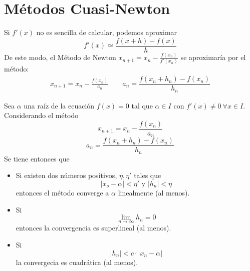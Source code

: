     \section{Métodos Cuasi-Newton}
    \begin{met}
    Si $f'(x)$ no es sencilla de calcular, podemos aproximar 
    $$f'(x)\simeq \dfrac{f(x+h)-f(x)}{h}$$
    De este modo, el Método de Newton $x_{n+1}=x_n-\frac{f(x_n)}{f'(x_n)}$
    se aproximaría por el método:
    \begin{align}
       x_{n+1}=x_n-\frac{f(x_n)}{a_n}\qquad a_n=\dfrac{f(x_n+h_n)-f(x_n)}{h_n}
       \label{met:cuasi}
    \end{align}
    \end{met}
    \begin{teo}
        Sea $\alpha$ una raíz de la ecuación $f(x)=0$ tal que $\alpha \in I$ con $f'(x)\neq 0 \: \forall x \in I$. Considerando el método
        $$x_{n+1}=x_n-\frac{f(x_n)}{a_n}$$
       $$a_n=\dfrac{f(x_n+h_n)-f(x_n)}{h_n}$$
       Se tiene entonces que
       \begin{itemize}
           \item Si existen dos números positivos, $\eta, \eta'$ tales que 
        $$|x_o-\alpha|<\eta ' \text{ y } |h_n|<\eta$$
        entonces el método converge a $\alpha$ linealmente (al menos).

       \item Si
       $$\lim_{n \to \infty} h_n = 0$$
        entonces la convergencia es superlineal (al menos).

        \item Si 
        $$|h_n|<c\cdot |x_n-\alpha|$$
        la convergecia es cuadrática (al menos).
    \end{itemize}
    \end{teo}
